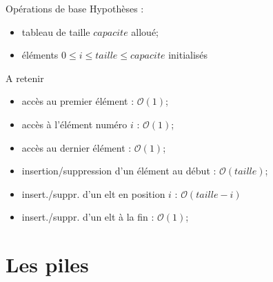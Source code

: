 \documentclass[10pt,xcolor=dvipsnames]{beamer}
\begin{document}
\begin{frame}{Opérations de base}
    Hypothèses :
    \begin{itemize}
        \item tableau de taille $capacite$ alloué;
        \item éléments $ 0 \leq i \leq taille \leq capacite$ initialisés
    \end{itemize}
    
    \begin{alertblock}{A retenir}
    \begin{itemize}[<+->]
        \item accès au premier élément : $\mathcal{O}(1)$;
        \item accès à l'élément numéro $i$ : $\mathcal{O}(1)$;
        \item accès au dernier élément : $\mathcal{O}(1)$;
        \item insertion/suppression d'un élément au début : $\mathcal{O}(taille)$;
        \item insert./suppr. d'un elt en position $i$ : $\mathcal{O}(taille - i)$
        \item insert./suppr. d'un elt à la fin : $\mathcal{O}(1)$;
    \end{itemize}
    \end{alertblock}
\end{frame}


\section{Les piles}
\end{document}
